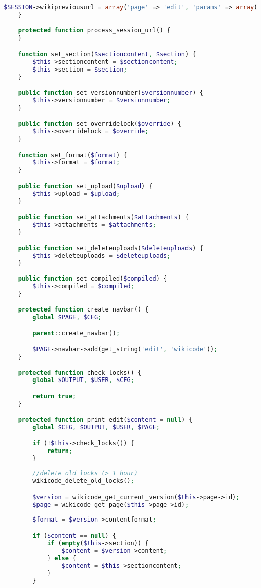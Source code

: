 \begin{lstlisting}[language=PHP]
        $SESSION->wikipreviousurl = array('page' => 'edit', 'params' => array('pageid' => $this->page->id, 'section' => $this->section));
    }

    protected function process_session_url() {
    }

    function set_section($sectioncontent, $section) {
        $this->sectioncontent = $sectioncontent;
        $this->section = $section;
    }

    public function set_versionnumber($versionnumber) {
        $this->versionnumber = $versionnumber;
    }

    public function set_overridelock($override) {
        $this->overridelock = $override;
    }

    function set_format($format) {
        $this->format = $format;
    }

    public function set_upload($upload) {
        $this->upload = $upload;
    }

    public function set_attachments($attachments) {
        $this->attachments = $attachments;
    }

    public function set_deleteuploads($deleteuploads) {
        $this->deleteuploads = $deleteuploads;
    }
	
	public function set_compiled($compiled) {
		$this->compiled = $compiled;
	}

    protected function create_navbar() {
        global $PAGE, $CFG;

        parent::create_navbar();

        $PAGE->navbar->add(get_string('edit', 'wikicode'));
    }

    protected function check_locks() {
        global $OUTPUT, $USER, $CFG;

        return true;
    }

    protected function print_edit($content = null) {
        global $CFG, $OUTPUT, $USER, $PAGE;

        if (!$this->check_locks()) {
            return;
        }
		
        //delete old locks (> 1 hour)
        wikicode_delete_old_locks();

        $version = wikicode_get_current_version($this->page->id);
		$page = wikicode_get_page($this->page->id);
		
        $format = $version->contentformat;

        if ($content == null) {
            if (empty($this->section)) {
                $content = $version->content;
            } else {
                $content = $this->sectioncontent;
            }
        }
		

\end{lstlisting}
